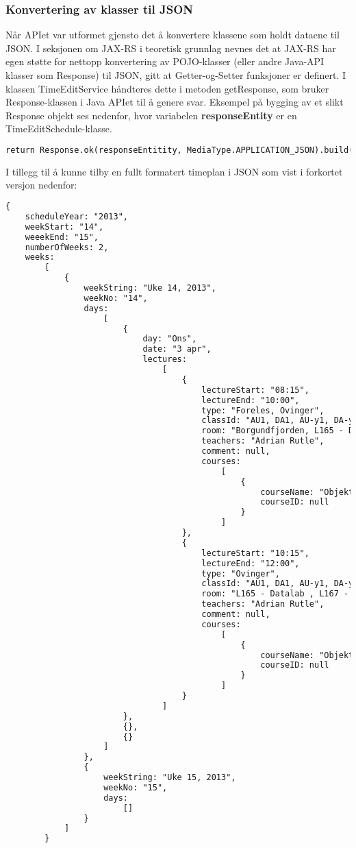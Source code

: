 \documentclass[../main.tex]{subfiles}
\begin{document}
\subsubsection{Konvertering av klasser til JSON}
Når APIet var utformet gjensto det å konvertere klassene som holdt dataene til JSON. I seksjonen om JAX-RS i teoretisk grunnlag nevnes det at JAX-RS har egen støtte for nettopp konvertering av POJO-klasser (eller andre Java-API klasser som Response) til JSON, gitt at Getter-og-Setter funksjoner er definert. I klassen TimeEditService håndteres dette i metoden getResponse, som bruker Response-klassen i Java APIet til å genere svar. Eksempel på bygging av et slikt Response objekt ses nedenfor, hvor variabelen \textbf{responseEntity} er en TimeEditSchedule-klasse.
\begin{lstlisting}[language=HTML, frame=single, caption={Oppsett av Response}]
return Response.ok(responseEntitity, MediaType.APPLICATION_JSON).build();
\end{lstlisting}

I tillegg til å kunne tilby en fullt formatert timeplan i JSON som vist i forkortet versjon nedenfor:

\begin{lstlisting}[language=HTML, frame=single, caption={Forkortet JSON- av en fullt formatert timeplan som hentet fra TimeEdit og behandlet i webapplikasjonen}]
{
	scheduleYear: "2013",
	weekStart: "14",
	weeekEnd: "15",
	numberOfWeeks: 2,
	weeks: 
		[
			{
				weekString: "Uke 14, 2013",
				weekNo: "14",
				days: 
					[
						{
							day: "Ons",
							date: "3 apr",
							lectures: 
								[
									{
										lectureStart: "08:15",
										lectureEnd: "10:00",
										type: "Foreles, Ovinger",
										classId: "AU1, DA1, AU-y1, DA-y1",
										room: "Borgundfjorden, L165 - Datalab , L167 - Prosjektrom",
										teachers: "Adrian Rutle",
										comment: null,
										courses: 
											[
												{
													courseName: "Objektorientert programmering",
													courseID: null
												}
											]
									},
									{
										lectureStart: "10:15",
										lectureEnd: "12:00",
										type: "Ovinger",
										classId: "AU1, DA1, AU-y1, DA-y1",
										room: "L165 - Datalab , L167 - Prosjektrom",
										teachers: "Adrian Rutle",
										comment: null,
										courses: 
											[
												{
													courseName: "Objektorientert programmering",
													courseID: null
												}
											]
									}
								]
						},
						{},
						{}
					]
				},
				{
					weekString: "Uke 15, 2013",
					weekNo: "15",
					days: 
						[]
				}
			]
		}
\end{lstlisting}
\end{document}
